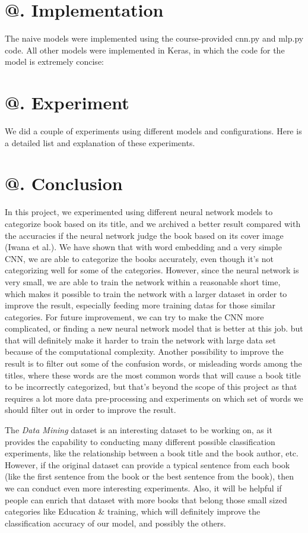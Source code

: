 \documentclass[jou,apacite, 10px]{apa6}
\makeatletter
\newcommand*{\rom}[1]{\expandafter\@slowromancap\romannumeral #1@}
\makeatother
\begin{document}
\section{\rom{4}. Implementation}
The naive models were implemented using the course-provided cnn.py and mlp.py code. All other models were implemented in Keras, in which the code for the model is extremely concise:\\


\section{\rom{5}. Experiment}
We did a couple of experiments using different models and configurations. Here is a detailed list and explanation of these experiments.

\section{\rom{6}. Conclusion}
In this project, we experimented using different neural network models to categorize book based on its title, and we archived a better result compared with the accuracies if the neural network judge the book based on its cover image (Iwana et al.). We have shown that with word embedding and a very simple CNN, we are able to categorize the books accurately, even though it's not categorizing well for some of the categories. However, since the neural network is very small, we are able to train the network within a reasonable short time, which makes it possible to train the network with a larger dataset in order to improve the result, especially feeding more training datas for those similar categories. For future improvement, we can try to make the CNN more complicated, or finding a new neural network model that is better at this job. but that will definitely make it harder to train the network with large data set because of the computational complexity. Another possibility to improve the result is to filter out some of the confusion words, or misleading words among the titles, where these words are the most common words that will cause a book title to be incorrectly categorized, but that's beyond the scope of this project as that requires a lot more data pre-processing and experiments on which set of words we should filter out in order to improve the result.

 The \textit{Data Mining} dataset is an interesting dataset to be working on, as it provides the capability to conducting many different possible classification experiments, like the relationship between a book title and the book author, etc. However, if the original dataset can provide a typical sentence from each book (like the first sentence from the book or the best sentence from the book), then we can conduct even more interesting experiments. Also, it will be helpful if people can enrich that dataset with more books that belong those small sized categories like Education \& training, which will definitely improve the classification accuracy of our model, and possibly the others.
\end{document}
